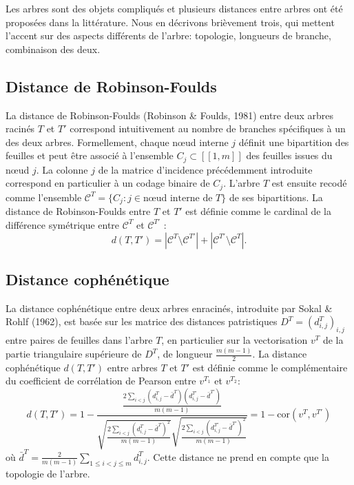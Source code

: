 \documentclass[12pt,a4paper]{reedthesis}
\theoremstyle{definition}
\theoremstyle{definition}
\theoremstyle{definition}
\theoremstyle{remark}
\begin{document}
Les arbres sont des objets compliqués et plusieurs distances entre arbres ont été proposées dans la littérature. Nous en décrivons brièvement trois, qui mettent l'accent sur des aspects différents de l'arbre: topologie, longueurs de branche, combinaison des deux.

\hypertarget{distance-de-robinson-foulds}{%
\subsection{Distance de Robinson-Foulds}\label{distance-de-robinson-foulds}}

La distance de Robinson-Foulds (Robinson \& Foulds, 1981) entre deux arbres racinés \(T\) et \(T'\) correspond intuitivement au nombre de branches spécifiques à un des deux arbres. Formellement, chaque nœud interne \(j\) définit une bipartition des feuilles et peut être associé à l'ensemble \(C_j \subset [\![1,m]\!]\) des feuilles issues du nœud \(j\). La colonne \(j\) de la matrice d'incidence précédemment introduite correspond en particulier à un codage binaire de \(C_j\). L'arbre \(T\) est ensuite recodé comme l'ensemble \(\mathcal{C}^T = \{C_j: j \in \text{nœud interne de } T\}\) de ses bipartitions. La distance de Robinson-Foulds entre \(T\) et \(T'\) est définie comme le cardinal de la différence symétrique entre \(\mathcal{C}^T\) et \(\mathcal{C}^{T'}\) :
\begin{equation*}
d(T, T') = | \mathcal{C}^T \setminus \mathcal{C}^{T'} | + | \mathcal{C}^{T'} \setminus \mathcal{C}^{T} |.
\end{equation*}
\hypertarget{distance-cophuxe9nuxe9tique}{%
\subsection{Distance cophénétique}\label{distance-cophuxe9nuxe9tique}}

La distance cophénétique entre deux arbres enracinés, introduite par Sokal \& Rohlf (1962), est basée sur les matrice des distances patristiques \(D^T = \left(d^T_{i,j}\right)_{i,j}\) entre paires de feuilles dans l'arbre \(T\), en particulier sur la vectorisation \(v^T\) de la partie triangulaire supérieure de \(D^T\), de longueur \(\frac{m(m-1)}{2}\). La distance cophénétique \(d(T, T')\) entre arbres \(T\) et \(T'\) est définie comme le complémentaire du coefficient de corrélation de Pearson entre \(v^{T_1}\) et \(v^{T_2}\):
\begin{equation*}
d(T, T') = 1 - \frac{ \frac{2\sum_{i < j} (d^{T}_{i,j} - \bar{d}^{T})(d^{T'}_{i,j} - \bar{d}^{T'})}{m(m-1)}}{\sqrt{\frac{2\sum_{i < j} (d^{T}_{i,j} - \bar{d}^{T})^2}{m(m-1)}} \sqrt{\frac{2\sum_{i < j} (d^{T'}_{i,j} - \bar{d}^{T'})^2}{m(m-1)}}} = 1 - \text{cor}(v^T, v^{T'})
\end{equation*}
où \(\bar{d}^{T} = \frac{2}{m(m-1)} \sum_{1 \leq i < j \leq m} d^{T}_{i,j}\). Cette distance ne prend en compte que la topologie de l'arbre.
\end{document}
